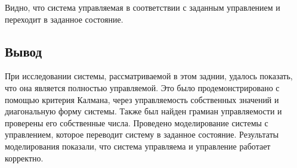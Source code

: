 Видно, что система управляемая в соответствии с заданным управлением и переходит в заданное состояние. 

\subsection{Вывод}
При исследовании системы, рассматриваемой в этом заднии, удалось показать, что она является 
полностью управляемой. Это было продемонстрировано с помощью критерия Калмана, через 
управляемость собственных значений и диагональную форму системы. Также был найден грамиан 
управляемости и проверены его собственные числа. Проведено моделирование системы с управлением, 
которое переводит систему в заданное состояние. Результаты моделирования показали, что система
управляема и управление работает корректно. 